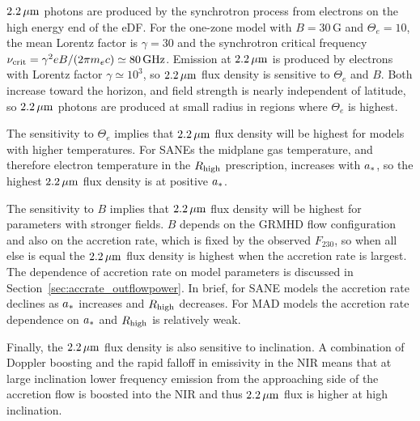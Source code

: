 
$2.2\,\mu\mathrm{m}$ photons are produced by the synchrotron process from electrons on the high energy end of the eDF.
For the one-zone model with $B = 30$\,G and $\Theta_e = 10$, the mean Lorentz factor is $\gamma = 30$ and the synchrotron critical frequency $\nu_\mathrm{crit} = \gamma^2 e B/(2 \pi m_e c) \simeq 80\,\mathrm{GHz}$.
Emission at $2.2\,\mu\mathrm{m}$ is produced by electrons with Lorentz factor $\gamma \simeq 10^3$, so $2.2\,\mu\mathrm{m}$ flux density is sensitive to $\Theta_e$ and $B$.
Both increase toward the horizon, and field strength is nearly independent of latitude, so $2.2\,\mu\mathrm{m}$ photons are produced at small radius in regions where $\Theta_e$ is highest.

The sensitivity to $\Theta_e$ implies that $2.2\,\mu\mathrm{m}$ flux density will be highest for models with higher temperatures.
For SANEs the midplane gas temperature, and therefore electron temperature in the $R_\mathrm{high}$ prescription, increases with $a_*$, so the highest $2.2\,\mu\mathrm{m}$ flux density is at positive $a_*$.

The sensitivity to $B$ implies that $2.2\,\mu\mathrm{m}$ flux density will be highest for parameters with stronger fields.  $B$ depends on the GRMHD flow configuration and also on the accretion rate, which is fixed by the observed $F_{230}$, so when all else is equal the $2.2\,\mu\mathrm{m}$ flux density is highest when the accretion rate is largest.  The dependence of accretion rate on model parameters is discussed in Section~\ref{sec:accrate_outflowpower}.  In brief, for SANE models the accretion rate declines as $a_*$ increases and $R_\mathrm{high}$ decreases. For MAD models the accretion rate dependence on $a_*$ and $R_\mathrm{high}$ is relatively weak.

Finally, the $2.2\,\mu\mathrm{m}$ flux density is also sensitive to inclination.  A combination of Doppler boosting and the rapid falloff in emissivity in the NIR means that at large inclination lower frequency emission from the approaching side of the accretion flow is boosted into the NIR and thus $2.2\,\mu\mathrm{m}$ flux is higher at high inclination.

